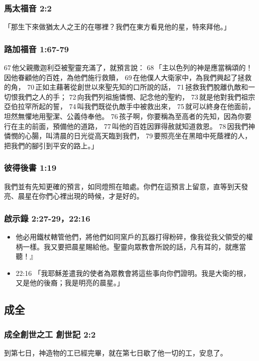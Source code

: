 \subsubsection{馬太福音 2:2}
「那生下來做猶太人之王的在哪裡？我們在東方看見他的星，特來拜他。」

\subsubsection{路加福音 1:67-79}
67 他父親撒迦利亞被聖靈充滿了，就預言說： 68 「主以色列的神是應當稱頌的！因他眷顧他的百姓，為他們施行救贖， 69 在他僕人大衛家中，為我們興起了拯救的角， 70 正如主藉著從創世以來聖先知的口所說的話， 71 拯救我們脫離仇敵和一切恨我們之人的手； 72 向我們列祖施憐憫、記念他的聖約， 73 就是他對我們祖宗亞伯拉罕所起的誓， 74 叫我們既從仇敵手中被救出來， 75 就可以終身在他面前，坦然無懼地用聖潔、公義侍奉他。 76 孩子啊，你要稱為至高者的先知，因為你要行在主的前面，預備他的道路， 77 叫他的百姓因罪得赦就知道救恩。 78 因我們神憐憫的心腸，叫清晨的日光從高天臨到我們， 79 要照亮坐在黑暗中死蔭裡的人，把我們的腳引到平安的路上。」

\subsubsection{彼得後書 1:19}
我們並有先知更確的預言，如同燈照在暗處。你們在這預言上留意，直等到天發亮、晨星在你們心裡出現的時候，才是好的。

\subsubsection{啟示錄 2:27-29，22:16}
\begin{itemize} 
\itemsep-.25em
\item 他必用鐵杖轄管他們，將他們如同窯戶的瓦器打得粉碎，像我從我父領受的權柄一樣。我又要把晨星賜給他。聖靈向眾教會所說的話，凡有耳的，就應當聽！』
\item  22:16 「我耶穌差遣我的使者為眾教會將這些事向你們證明。我是大衛的根，又是他的後裔；我是明亮的晨星。」
\end{itemize} 


\subsection{成全}

\subsubsection{成全創世之工 創世記 2:2}
到第七日，神造物的工已經完畢，就在第七日歇了他一切的工，安息了。

